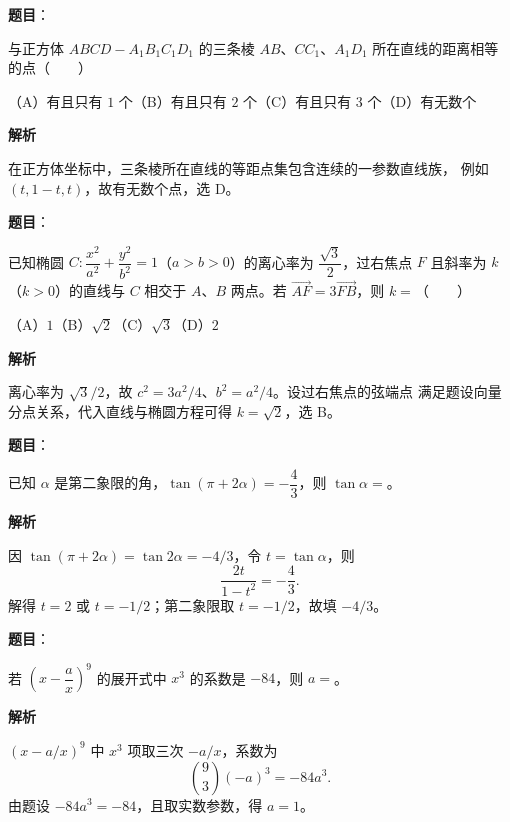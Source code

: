 \begin{answer}

\textbf{题目}：

与正方体 $ABCD-A_1B_1C_1D_1$ 的三条棱 $AB\text{、}CC_1\text{、}A_1D_1$ 所在直线的距离相等的点\mbox{（　　）}

（A）有且只有 $1$ 个\quad（B）有且只有 $2$ 个\quad（C）有且只有 $3$ 个\quad（D）有无数个

\textbf{解析}

在正方体坐标中，三条棱所在直线的等距点集包含连续的一参数直线族，
例如 $(t,1-t,t)$，故有无数个点，选 D。


\end{answer}
\begin{answer}

\textbf{题目}：

已知椭圆 $C:\dfrac{x^2}{a^2}+\dfrac{y^2}{b^2}=1$（$a>b>0$）的离心率为 $\dfrac{\sqrt3}{2}$，过右焦点 $F$ 且斜率为 $k$（$k>0$）的直线与 $C$ 相交于 $A\text{、}B$ 两点。若 $\overrightarrow{AF}=3\overrightarrow{FB}$，则 $k=$\mbox{（　　）}

（A）$1$\quad（B）$\sqrt2$\quad（C）$\sqrt3$\quad（D）$2$

\textbf{解析}

离心率为 $\sqrt3/2$，故 $c^2=3a^2/4$、$b^2=a^2/4$。设过右焦点的弦端点
满足题设向量分点关系，代入直线与椭圆方程可得 $k=\sqrt2$，选 B。


\end{answer}
\begin{answer}

\textbf{题目}：

已知 $\alpha$ 是第二象限的角，$\tan(\pi+2\alpha)=-\dfrac43$，则 $\tan\alpha=$\gkblank{}。

\textbf{解析}

因 $\tan(\pi+2\alpha)=\tan2\alpha=-4/3$，令 $t=\tan\alpha$，则
\nopagebreak[4]
\[
\frac{2t}{1-t^2}=-\frac43.
\]
解得 $t=2$ 或 $t=-1/2$；第二象限取 $t=-1/2$，故填 $-4/3$。


\end{answer}
\begin{answer}

\textbf{题目}：

若 $\left(x-\dfrac ax\right)^9$ 的展开式中 $x^3$ 的系数是 $-84$，则 $a=$\gkblank{}。

\textbf{解析}

$(x-a/x)^9$ 中 $x^3$ 项取三次 $-a/x$，系数为
\nopagebreak[4]
\[
\binom93(-a)^3=-84a^3.
\]
由题设 $-84a^3=-84$，且取实数参数，得 $a=1$。


\end{answer}
